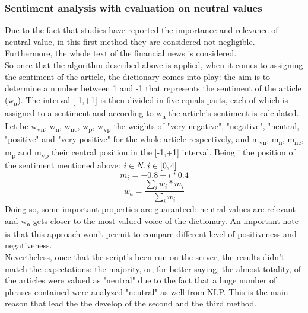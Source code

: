 \subsubsection{Sentiment analysis with evaluation on neutral values}
Due to the fact that studies have reported the importance and relevance of neutral value\cite{neutralvalues}, in this first method they are considered not negligible. Furthermore, the whole text of the financial news is considered.\\
So once that the algorithm described above is applied, when it comes to assigning the sentiment of the article, the dictionary comes into play: the aim is to determine a number between 1 and -1 that represents the sentiment of the article (w\textsubscript{a}). The interval [-1,+1] is then divided in five equals parts, each of which is assigned to a sentiment and according to w\textsubscript{a} the article's sentiment is calculated.\\
Let be w\textsubscript{vn}, w\textsubscript{n}, w\textsubscript{ne}, w\textsubscript{p}, w\textsubscript{vp} the weights of "very negative", "negative", "neutral, "positive" and "very positive" for the whole article respectively, and m\textsubscript{vn}, m\textsubscript{n}, m\textsubscript{ne}, m\textsubscript{p} and m\textsubscript{vp} their central position in the [-1,+1] interval. Being i the position of the sentiment mentioned above:\newline \newline
\begin{math}
i \in N, i \in [0,4] \\
\end{math}
\begin{equation}
m_i= -0.8+i*0.4
\end{equation}
\begin{equation}
w_a = \frac{\sum\limits_{i} w_i * m_i}{\sum\limits_{i} w_i}
\end{equation}
Doing so, some important properties are guaranteed: neutral values are relevant and w\textsubscript{a} gets closer to the most valued voice of the dictionary. An important note is that this approach won't permit to compare different level of positiveness and negativeness. \\
Nevertheless, once that the script's been run on the server, the results didn't match the expectations: the majority, or, for better saying, the almost totality, of the articles were valued as "neutral" due to the fact that a huge number of phrases contained were analyzed "neutral" as well from NLP. This is the main reason that lead the the develop of the second and the third method.

